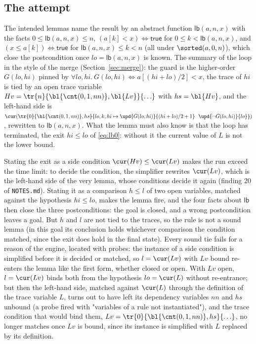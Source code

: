 \subsection{The attempt}
The intended lemmas name the result by an abstract function $\mathsf{lb}(a, n, x)$ with the facts
$0 \le \mathsf{lb}(a, n, x) \le n$, $(a[k] < x) \Leftrightarrow \mathsf{true}$ for $0 \le k < \mathsf{lb}(a, n, x)$,
and $(x \le a[k]) \Leftrightarrow \mathsf{true}$ for $\mathsf{lb}(a, n, x) \le k < n$ (all under $\sorted(a, 0, n)$),
which close the postcondition once $lo = \mathsf{lb}(a, n, x)$ is known. The summary of the loop in the style of
the merge (Section~\ref{sec:merge}): the guard is the higher-order $G(lo, hi)$ pinned by
$\forall lo, hi.\ G(lo, hi) \Leftrightarrow a[(hi + lo)/2] < x$, the trace of $hi$ is tied by an open trace variable
$Hv = \tr{n}{\bl{\cnt(0, 1, nn)}, \bl{Lv}}{\ldots}$ with $hs = \bl{Hv}$, and the left-hand side is
$\cur(\tr{0}{\bl{\cnt(0, 1, nn)}, hs}{lo, k, hi \mapsto \upd{G(lo, hi)}{(hi + lo)/2 + 1}\ \ \upd{\neg G(lo, hi)}{lo}})$,
rewritten to $\mathsf{lb}(a, n, x)$. What the lemma must also know is that the loop has terminated, the exit
$hi \le lo$ of \eqref{eq:lb0}: without it the current value of $L$ is not the lower bound.

Stating the exit as a side condition $\cur(Hv) \le \cur(Lv)$ makes the run exceed the time limit: to decide
the condition, the simplifier rewrites $\cur(Lv)$, which is the left-hand side of the very lemma, whose
conditions decide it again (finding 20 of \texttt{NOTES.md}). Stating it as a comparison $h \le l$ of two
open variables, matched against the hypothesis $hi \le lo$, makes the lemma fire, and the four facts about
$\mathsf{lb}$ then close the three postconditions: the goal is closed, and a wrong postcondition leaves a
goal. But $h$ and $l$ are not tied to the traces, so the rule is not a sound lemma (in this goal its
conclusion holds whichever comparison the condition matched, since the exit does hold in the final state).
Every sound tie fails for a reason of the engine, located with probes: the instance of a side condition is
simplified before it is decided or matched, so $l = \cur(Lv)$ with $Lv$ bound re-enters the lemma like the
first form, whether closed or open. With $Lv$ open, $l = \cur(Lv)$ binds both from the hypothesis $lo = \cur(L)$
without re-entrance; but then the left-hand side, matched against $\cur(L)$ through the definition of the
trace variable $L$, turns out to have left its dependency variables $nn$ and $hs$ unbound (a probe fired with
"variables of a rule not instantiated"), and the trace condition that would bind them,
$Lv = \tr{0}{\bl{\cnt(0, 1, nn)}, hs}{\ldots}$, no longer matches once $Lv$ is bound, since its instance is
simplified with $L$ replaced by its definition.

